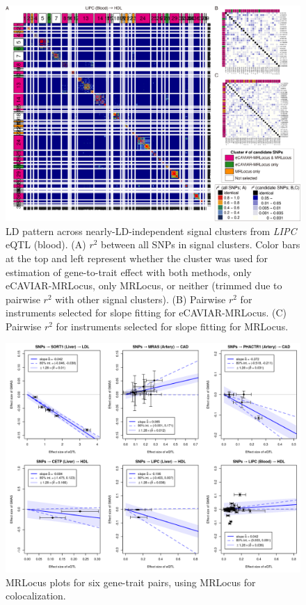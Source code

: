 \documentclass[11pt]{article}
\begin{document}
\begin{figure}[!ht]
  \centering
  \includegraphics[width=\textwidth]{figs/region/heatmap_eQTLbase.Blood_LIPC_HDL.20210114.png}
  \caption{LD pattern across nearly-LD-independent signal clusters
    from \emph{LIPC} eQTL (blood).
    (A) $r^2$ between all SNPs in signal clusters. Color bars at the
    top and left represent whether the cluster was used for estimation of
    gene-to-trait effect with both methods, only eCAVIAR-MRLocus, only
    MRLocus, or neither (trimmed due to pairwise $r^2$ with other
    signal clusters). (B) Pairwise $r^2$ for instruments selected for
    slope fitting for eCAVIAR-MRLocus. (C) Pairwise $r^2$ for
    instruments selected for slope fitting for MRLocus.}
\end{figure}

\begin{figure}[!ht]
  \centering
  \includegraphics[width=\textwidth]{figs/real_loci_mrlocus.png}
  \caption{MRLocus plots for six gene-trait pairs, using MRLocus for colocalization.}
\end{figure}
\end{document}
